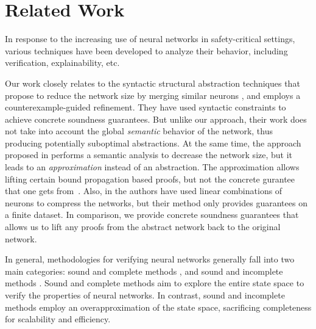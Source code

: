\section{Related Work}

 

In response to the increasing use of neural networks in safety-critical settings, 
various techniques have been developed to analyze their behavior, including 
verification, explainability, etc. 

Our work closely relates to the syntactic structural abstraction techniques that
propose to reduce the network size by merging similar
neurons \cite{cegar-nn,cegarette,cleverest-nn}, and employs a
counterexample-guided refinement. They have used
syntactic constraints to achieve concrete soundness guarantees. But unlike our
approach, their work does not take into account the global \textit{semantic}
behavior of the network, thus producing potentially suboptimal abstractions.
At the same time, the approach proposed in \cite{deep-abstract} performs a
semantic analysis to decrease the network size, but it leads to an
\emph{approximation} instead of an abstraction. The approximation allows
lifting certain bound propagation based proofs, but not the concrete gurantee
that one gets from~\cite{cegar-nn}. Also, in \cite{lin-comb-abs-jan} the
authors have used linear combinations of neurons to compress the networks, but
their method only provides guarantees on a finite dataset. In comparison, we
provide concrete soundness guarantees that allows us to lift any proofs from
the abstract network back to the original network.


In general, methodologies for verifying neural networks generally fall into two
main categories: sound and complete methods
\cite{reluplex,formal-ver-piece-wise,comp-reachability-analysis,comp-milp,comp-out-range,comp-max-resilience,marabou,comp-safety-ver-dnn,beta-crown,alpha-crown-bab-fnc,gcp-crown},
and sound and incomplete methods
\cite{deeppoly,crown,incomp-dual-approach,incomp-abs-inp,incomp-robustness-certi,incomp-boost-robustness}.
Sound and complete methods aim to explore the entire state space to verify the
properties of neural networks.
In contrast, sound and incomplete methods employ an overapproximation
of the state space, sacrificing completeness for 
scalability and efficiency.


